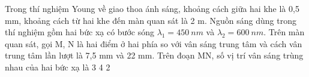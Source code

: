 \begin{ex}%
Trong thí nghiệm Young về giao thoa ánh sáng, khoảng cách giữa hai khe là 0,5 mm, khoảng cách từ hai khe đến màn quan sát là 2 m. Nguồn sáng dùng trong thí nghiệm gồm hai bức xạ có bước sóng $\lambda _1=450\ nm$ và $\lambda _2=600\ nm$. Trên màn quan sát, gọi M, N là hai điểm ở hai phía so với vân sáng trung tâm và cách vân trung tâm lần lượt là 7,5 mm và 22 mm. Trên đoạn MN, số vị trí vân sáng trùng nhau của hai bức xạ là
\choice
{3}
{4}
{2}
{}

\end{ex} 

